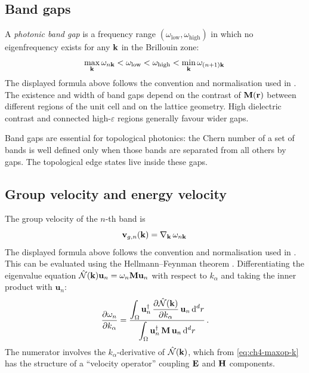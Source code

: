 \subsection{Band gaps}
\label{sec:ch4-band-gaps}

A \emph{photonic band gap} is a frequency range
$(\omega_{\mathrm{low}},\omega_{\mathrm{high}})$ in which no
eigenfrequency exists for any $\mathbf{k}$ in the Brillouin zone:
\begin{equation}
  \max_{\mathbf{k}}\omega_{n\mathbf{k}} < \omega_{\mathrm{low}}
  < \omega_{\mathrm{high}}
  < \min_{\mathbf{k}}\omega_{(n+1)\mathbf{k}}\,
\end{equation}
The displayed formula above follows the convention and normalisation used in \cite{wang2007reflection}.
The existence and width of band gaps depend on the contrast of
$\mathbf{M}(\mathbf{r})$ between different regions of the unit cell and on the
lattice geometry.  High dielectric contrast and connected
high-$\varepsilon$ regions generally favour wider gaps.

Band gaps are essential for topological photonics: the Chern number of a
set of bands is well defined only when those bands are separated from
all others by gaps.  The topological edge states live inside these
gaps.

\subsection{Group velocity and energy velocity}
\label{sec:ch4-velocity}

The group velocity of the $n$-th band is
\begin{equation}\label{eq:ch4-group-velocity}
  \mathbf{v}_{g,n}(\mathbf{k})
  = \nabla_{\mathbf{k}}\,\omega_{n\mathbf{k}}\,
\end{equation}
The displayed formula above follows the convention and normalisation used in \cite{raghu2008analogs}.
This can be evaluated using the Hellmann--Feynman theorem
\cite{haldane2008reflection}.
Differentiating the eigenvalue equation
$\hat{\mathcal{N}}(\mathbf{k})\mathbf{u}_n=\omega_n\mathbf{M}\mathbf{u}_n$ with respect to
$k_\alpha$ and taking the inner product with $\mathbf{u}_n$:
\begin{equation}\label{eq:ch4-hellmann-feynman}
  \frac{\partial \omega_n}{\partial k_\alpha}
  = \frac{
    \displaystyle\int_\Omega\mathbf{u}_n^\dagger\,
    \frac{\partial \hat{\mathcal{N}}(\mathbf{k})}{\partial k_\alpha}\,\mathbf{u}_n\,\mathrm{d}^d r
  }{
    \displaystyle\int_\Omega\mathbf{u}_n^\dagger\,\mathbf{M}\,
    \mathbf{u}_n\,\mathrm{d}^d r
  }\,.
\end{equation}
The numerator involves the $k_\alpha$-derivative of $\hat{\mathcal{N}}(\mathbf{k})$,
which from \eqref{eq:ch4-maxop-k} has the structure of a ``velocity
operator'' coupling $\mathbf{E}$ and $\mathbf{H}$ components.

